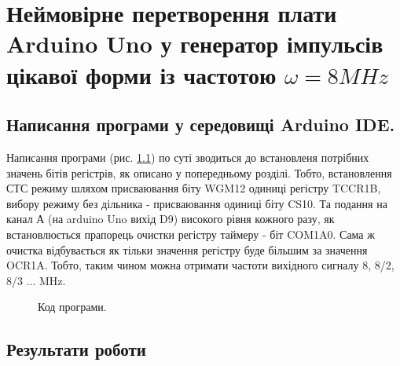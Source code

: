 \chapter{Неймовірне перетворення плати Arduino Uno у генератор імпульсів цікавої форми із частотою $\omega = 8 MHz$} 
\label{chap:second}

\section{Написання програми у середовищі Arduino IDE.}

Написання програми (рис. \ref{fig:code}) по суті зводиться до встановленя потрібних значень бітів регістрів, як описано у попередньому розділі. Тобто, встановлення СТС режиму шляхом присваювання біту WGM12 одиниці регістру TCCR1B, вибору режиму без дільника - присваювання одиниці біту CS10. Та подання на канал А (на arduino Uno вихід D9) високого рівня кожного разу, як встановлюється прапорець очистки регістру таймеру - біт COM1A0. Сама ж очистка відбувається як тільки значення регістру буде більшим за значення OCR1A. Тобто, таким чином можна отримати частоти вихідного сигналу 8, 8/2, 8/3 ... MHz. 
\begin{figure}[h]
\caption{Код програми.}
\label{fig:code}
\end{figure}

\section{Результати роботи}


